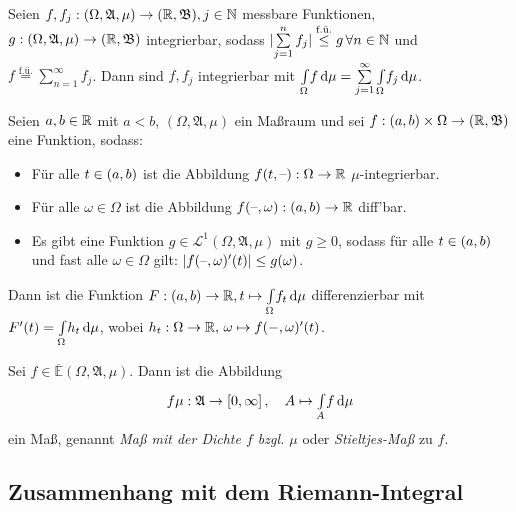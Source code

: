 \documentclass{cheat-sheet}
\newcommand{\Alg}{\mathfrak{A}} %
\newcommand{\Bor}{\mathfrak{B}} %
\newcommand{\E}{\mathbb{E}} %
\newcommand{\Leb}{\mathcal{L}} %
\newcommand{\fue}{\overset{\text{f.ü.}}} %
\theoremstyle{definition}
\newcommand{\IntOmu}[1]{\Int{\Omega}{}{#1}{\mu}} %
\begin{document}
\begin{satz}\begin{doublespace}
  Seien $f, f_j : (\Omega, \Alg, \mu) \to (\R, \Bor), j \in \N$ messbare Funktionen, $g : (\Omega, \Alg, \mu) \to (\R, \Bor)$ integrierbar, sodass $\abs{\sum_{j=1}^n f_j} \overset{\text{f.ü.}}\leq g \, \forall n \in \N$ und\\[-5pt]
  $f \fue= \sum_{n=1}^\infty f_j$. Dann sind $f, f_j$ integrierbar mit $\IntOmu{f} = \sum_{j=1}^\infty \IntOmu{f_j}$.
\end{doublespace}\end{satz}

\vspace{-20pt}

\begin{satz}
  Seien $a, b \in \mathbb{R}$ mit $a < b$, $(\Omega, \Alg, \mu)$ ein Maßraum und sei $f : \ointerval{a}{b} \times \Omega \to (\R, \Bor)$ eine Funktion, sodass:
  \begin{itemize}
    \item Für alle $t \in \left( a, b \right)$ ist die Abbildung $f(t, \text{--}) : \Omega \to \mathbb{R}$ $\mu$-integrierbar.
    \item Für alle $\omega \in \Omega$ ist die Abbildung $f(\text{--}, \omega) : \left( a, b \right) \to \mathbb{R}$ diff'bar.
    \item Es gibt eine Funktion $g \in \Leb^1(\Omega, \Alg, \mu)$ mit $g \geq 0$, sodass für alle $t \in \left( a, b \right)$ und fast alle $\omega \in \Omega$ gilt: $\lvert f(\text{--}, \omega)'(t)\rvert \leq g(\omega)$.
  \end{itemize}
  Dann ist die Funktion $F : \ointerval{a}{b} \to \R, t \mapsto \IntOmu{f_t}$ differenzierbar mit\\[-3pt]
  $F'(t) = \IntOmu{h_t}$, wobei $h_t : \Omega \to \mathbb{R}, \, \omega \mapsto f(-, \omega)'(t)$.
\end{satz}

\begin{samepage}

\begin{satz}
  Sei $f \in \overline{\E}(\Omega, \Alg, \mu)$. Dann ist die Abbildung
  \[ f \mu : \Alg \to \cinterval{0}{\infty}, \quad A \mapsto \Int{A}{}{f}{\mu} \]
  ein Maß, genannt \emph{Maß mit der Dichte $f$ bzgl. $\mu$} oder \emph{Stieltjes-Maß} zu $f$.
\end{satz}

\subsection{Zusammenhang mit dem Riemann-Integral}

\end{samepage}
\end{document}
